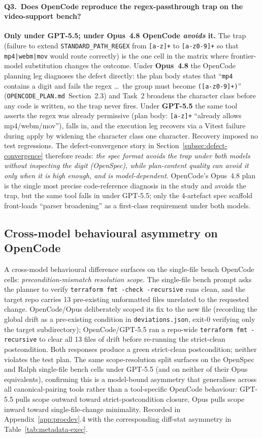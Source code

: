 \paragraph{Q3.\ Does OpenCode reproduce the regex-passthrough
trap on the video-support bench?} \textbf{Only under GPT-5.5; under
Opus~4.8 OpenCode \emph{avoids} it.} The trap (failure to extend
\texttt{STANDARD\_PATH\_REGEX} from \texttt{[a-z]+} to
\texttt{[a-z0-9]+} so that \texttt{mp4|webm|mov} would route
correctly) is the one cell in the matrix where frontier-model
substitution changes the outcome. Under \textbf{Opus~4.8} the
OpenCode planning leg diagnoses the defect directly: the plan body
states that ``\texttt{mp4} contains a digit and fails the regex
\ldots\ the group must become \texttt{([a-z0-9]+)}''
(\texttt{OPENCODE\_PLAN.md}~Section~2.3) and Task~2 broadens the character
class before any code is written, so the trap never fires. Under
\textbf{GPT-5.5} the same tool asserts the regex was already permissive
(plan body: \texttt{[a-z]+} ``already allows mp4/webm/mov''), falls in,
and the execution leg recovers via a Vitest failure during apply by
widening the character class one character. Recovery imposed no test
regressions. The defect-convergence story in
Section~\ref{subsec:defect-convergence} therefore reads: \emph{the
spec format avoids the trap under both models without inspecting the
digit (OpenSpec), while plan-content quality can avoid it only when it
is high enough, and is model-dependent}. OpenCode's Opus~4.8 plan
is the single most precise code-reference diagnosis in the study and
avoids the trap, but the same tool falls in under GPT-5.5; only the
4-artefact spec scaffold front-loads ``parser broadening'' as a
first-class requirement under both models.

\subsection{Cross-model behavioural asymmetry on OpenCode}

A cross-model behavioural difference surfaces on the single-file bench
OpenCode cells: \emph{precondition-mismatch resolution scope}. The
single-file bench prompt asks the planner to verify
\texttt{terraform fmt -check -recursive} runs clean, and the target
repo carries 13 pre-existing unformatted files unrelated to the
requested change. OpenCode/Opus deliberately scoped its fix to the
new file (recording the global drift as a pre-existing condition in
\texttt{deviations.json}, exit-0 verifying only the target
subdirectory); OpenCode/GPT-5.5 ran a repo-wide
\texttt{terraform fmt -recursive} to clear all 13 files of drift
before re-running the strict-clean postcondition. Both responses
produce a green strict-clean postcondition; neither violates the
test plan. The same scope-resolution split surfaces on the OpenSpec
and Ralph single-file bench cells under GPT-5.5 (and on neither of
their Opus equivalents), confirming this is a model-bound asymmetry
that generalises across all canonical-pairing tools rather than a
tool-specific OpenCode behaviour: GPT-5.5 pulls scope outward
toward strict-postcondition closure, Opus pulls scope inward toward
single-file-change minimality. Recorded in
Appendix~\ref{app:procdev}.4 with the corresponding diff-stat
asymmetry in Table~\ref{tab:metadata-exec}.
